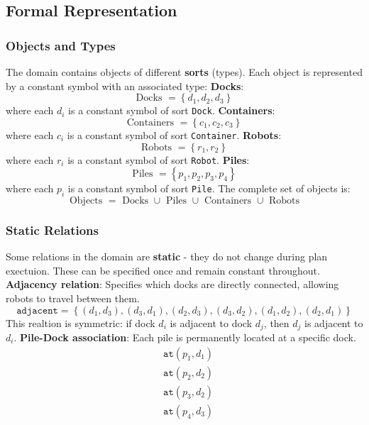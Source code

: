 \documentclass[a4paper]{article}
\theoremstyle{definition}
\begin{document}
\subsection{Formal Representation}
\subsubsection{Objects and Types}
The domain contains objects of different \textbf{sorts} (types). Each object is represented by a constant symbol 
with an associated type:
\vspace{1em}
\noindent
\newline
\textbf{Docks}: 
\[
    \text{Docks } = \left\{ d_1, d_2, d_3 \right\}
\]
where each \( d_i \) is a constant symbol of sort \texttt{Dock}.
\vspace{1em}
\noindent
\newline
\textbf{Containers}:
\[
  \text{Containers } = \left\{ c_1, c_2, c_3 \right\} 
\]
where each \( c_i \) is a constant symbol of sort \texttt{Container}.
\vspace{1em}
\noindent
\newline
\textbf{Robots}:
\[
  \text{Robots } = \left\{ r_1, r_2 \right\}
\]
where each \( r_i \) is a constant symbol of sort \texttt{Robot}.
\vspace{1em}
\noindent
\newline
\textbf{Piles}:
\[
  \text{Piles } = \left\{ p_1, p_2, p_3, p_4 \right\}
\]
where each \( p_i \) is a constant symbol of sort \texttt{Pile}.
\vspace{1em}
\noindent
\newline
The complete set of objects is:
\[
  \text{Objects } = \text{ Docks } \cup \text{ Piles } \cup \text{ Containers } \cup \text{ Robots}
\]
\subsubsection{Static Relations}
Some relations in the domain are \textbf{static} - they do not change during plan exectuion. These can be specified 
once and remain constant throughout.
\vspace{1em}
\noindent
\newline
\textbf{Adjacency relation}: Specifies which docks are directly connected, allowing robots to travel between them.
\[
  \texttt{adjacent} = \left\{ (d_1,d_3), (d_3,d_1), (d_2,d_3), (d_3,d_2), (d_1,d_2), (d_2,d_1) \right\}
\]
This realtion is symmetric: if dock \( d_i \) is adjacent to dock \( d_j \), then \( d_j \) is adjacent to \( d_i \).
\vspace{1em}
\noindent
\newline
\textbf{Pile-Dock association}: Each pile is permanently located at a specific dock.
\begin{align*}
    &\texttt{at}(p_1,d_1)\\
    &\texttt{at}(p_2,d_2)\\
    &\texttt{at}(p_3,d_2)\\
    &\texttt{at}(p_4,d_3)\\
\end{align*}
\end{document}
